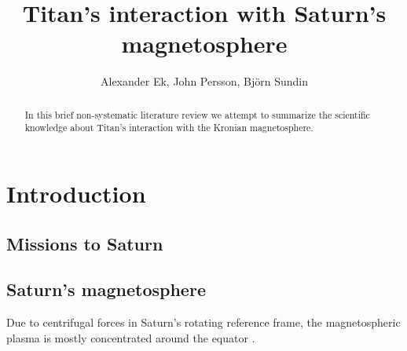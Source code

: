 \documentclass[12pt, parskip=full*, abstract]{scrartcl}
\title{Titan's interaction with Saturn's magnetosphere}
\author{Alexander Ek, John Persson, Björn Sundin}
\begin{document}
\maketitle
\vspace{5mm}
\begin{abstract}
	In this brief non-systematic literature review we attempt to summarize the scientific knowledge about Titan's interaction with the Kronian magnetosphere.
\end{abstract}

\newpage
\tableofcontents
\newpage

\section{Introduction}
\subsection{Missions to Saturn}


\subsection{Saturn's magnetosphere}

Due to centrifugal forces in Saturn's rotating reference frame, the magnetospheric plasma is mostly concentrated around the equator \parencite{solar-system-magnetospheres}.


\end{document}

